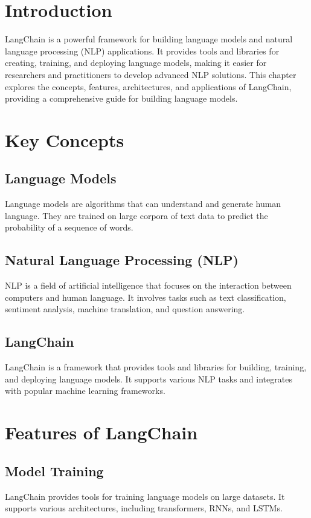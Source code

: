 \section{Introduction}
LangChain is a powerful framework for building language models and natural language processing (NLP) applications. It provides tools and libraries for creating, training, and deploying language models, making it easier for researchers and practitioners to develop advanced NLP solutions. This chapter explores the concepts, features, architectures, and applications of LangChain, providing a comprehensive guide for building language models.

\section{Key Concepts}

\subsection{Language Models}
Language models are algorithms that can understand and generate human language. They are trained on large corpora of text data to predict the probability of a sequence of words.

\subsection{Natural Language Processing (NLP)}
NLP is a field of artificial intelligence that focuses on the interaction between computers and human language. It involves tasks such as text classification, sentiment analysis, machine translation, and question answering.

\subsection{LangChain}
LangChain is a framework that provides tools and libraries for building, training, and deploying language models. It supports various NLP tasks and integrates with popular machine learning frameworks.

\section{Features of LangChain}

\subsection{Model Training}
LangChain provides tools for training language models on large datasets. It supports various architectures, including transformers, RNNs, and LSTMs.

